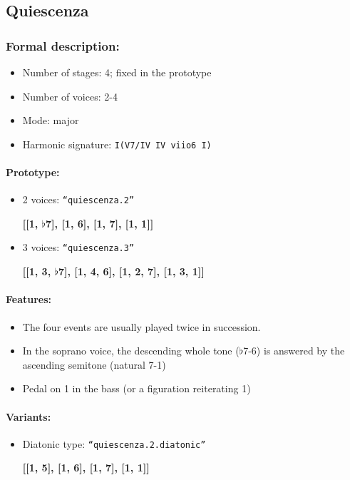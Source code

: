 ﻿\documentclass[11pt, openany]{article}
\begin{document}
\begin{itemize}
	\subsection{Quiescenza}
	
\subsubsection{Formal description:}
\begin{itemize}
\item Number of stages: 4; fixed in the prototype
\item Number of voices: 2-4
\item Mode: major
\item Harmonic signature: \texttt{I(V7/IV IV viio6 I)}
\end{itemize}

\paragraph{Prototype:}
\begin{itemize}
\item 2 voices: \texttt{“quiescenza.2”}
	\begin{center}
	\textbf{[[1, $\flat$7], [1, 6], [1, 7], [1, 1]]}
	\end{center}
\item 3 voices: \texttt{“quiescenza.3”}
	\begin{center}
	\textbf{[[1, 3, $\flat$7], [1, 4, 6], [1, 2, 7], [1, 3, 1]]}
	\end{center}
\end{itemize}

\paragraph{Features:}
\begin{itemize}
\item The four events are usually played twice in succession.
\item In the soprano voice, the descending whole tone ($\flat$7-6) is answered by the ascending semitone (natural 7-1)
\item Pedal on 1 in the bass (or a figuration reiterating 1)
\end{itemize}

\paragraph{Variants:}
\begin{itemize}
\item Diatonic type: \texttt{“quiescenza.2.diatonic”}
	\begin{center}
	\textbf{[[1, 5], [1, 6], [1, 7], [1, 1]]}
	\end{center}
\end{itemize}


\end{itemize}
\end{document}
